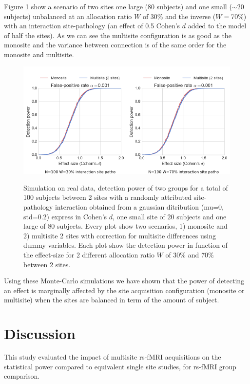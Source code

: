 \documentclass[authoryear]{elsarticle}
\begin{document}
Figure \ref{fig_real_sim_debalancing_2sites} show a scenario of two sites one large (80 subjects) and one small ($\sim20$ subjects) unbalanced at an allocation ratio $W$ of 30\% and the inverse ($W=$70\%) with an interaction site-pathology (an effect of 0.5 Cohen's $d$ added to the model of half the sites). As we can see the multisite configuration is as good as the monosite and the variance between connection is of the same order for the monosite and multisite.

\begin{figure}[tbp]
\centering
\captionsetup[subfloat]{labelformat=empty}
{\includegraphics[width=.75\textwidth]{../figures/simulations_real_2sites.png}}
\caption{
Simulation on real data, detection power of two groups for a total of 100 subjects between 2 sites with a randomly attributed site-pathology interaction obtained from a gaussian ditribution (mu=0, std=0.2) express in Cohen’s $d$, one small site of 20 subjects and one large of 80 subjects. Every plot show two scenarios, 1) monosite and 2) multisite 2 sites with correction for multisite differences using dummy variables. Each plot show the detection power in function of the effect-size for 2 different allocation ratio $W$ of 30\% and 70\% between 2 sites.
}
\label{fig_real_sim_debalancing_2sites}
\end{figure}


Using these Monte-Carlo simulations we have shown that the power of detecting an effect is marginally affected by the site acquisition configuration (monosite or multisite) when the sites are balanced in term of the amount of subject.




\section{Discussion}
This study evaluated the impact of multisite rs-fMRI acquisitions on the statistical power compared to equivalent single site studies, for rs-fMRI group comparison.\\
\end{document}

